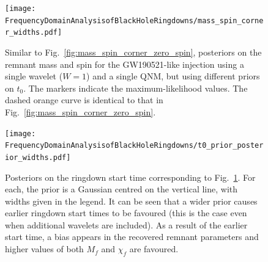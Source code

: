 \begin{figure}[t!]
    \centering
    \texttt{[image: FrequencyDomainAnalysisofBlackHoleRingdowns/mass\_spin\_corner\_widths.pdf]}
    \caption[Posteriors on the remnant mass and spin for a GW190521-like injection analysed with different choices of ringdown start-time prior]{ 
    Similar to Fig.~\ref{fig:mass_spin_corner_zero_spin}, posteriors on the remnant mass and spin for the GW190521-like injection using a single wavelet ($W=1$) and a single QNM, but using different priors on $t_0$.
    The markers indicate the maximum-likelihood values.
    The dashed orange curve is identical to that in Fig.~\ref{fig:mass_spin_corner_zero_spin}.
    }
    \label{fig:start_time_prior}
\end{figure}

\begin{figure}[t!]
    \centering
    \texttt{[image: FrequencyDomainAnalysisofBlackHoleRingdowns/t0\_prior\_posterior\_widths.pdf]}
    \caption[Posteriors on the ringdown start time for the same analyses as in Fig.~\ref{fig:start_time_prior}]{ 
    Posteriors on the ringdown start time corresponding to Fig.~\ref{fig:start_time_prior}. 
    For each, the prior is a Gaussian centred on the vertical line, with widths given in the legend.
    It can be seen that a wider prior causes earlier ringdown start times to be favoured (this is the case even when additional wavelets are included). 
    As a result of the earlier start time, a bias appears in the recovered remnant parameters and higher values of both $M_f$ and $\chi_f$ are favoured.
    }
    \label{fig:start_time_posterior}
\end{figure}


